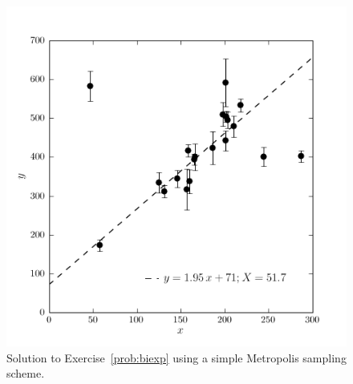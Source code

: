 \documentclass[12pt,twoside]{article}
\newcommand{\problemname}{Exercise}
\newcounter{problem}
\begin{document}
\clearpage
\begin{figure}[H]
\includegraphics[]{ex6c.png}
\caption{Solution to \problemname~\ref{prob:biexp} using a simple Metropolis sampling scheme.}\label{fig:biexpc}
\end{figure}
\end{document}
